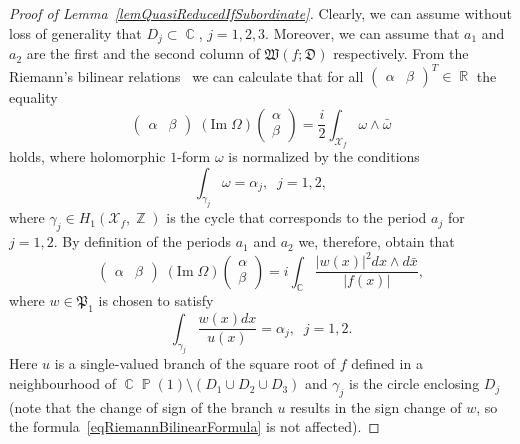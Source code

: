 \documentclass{amsart}
\numberwithin{equation}{section}
\theoremstyle{definition}
\theoremstyle{remark}
\DeclareMathOperator{\CC}{\mathbb C}
\DeclareMathOperator{\RR}{\mathbb R}
\DeclareMathOperator{\ZZ}{\mathbb Z}
\DeclareMathOperator{\PP}{\mathbb P}
\begin{document}
	\begin{proof}[Proof of Lemma~\ref{lemQuasiReducedIfSubordinate}]
		Clearly, we can assume without loss of generality that $D_j \subset \CC$, $j = 1,2,3$. Moreover, we can assume that $a_1$ and $a_2$ are the first and the second column of $\mathfrak W(f;\mathfrak D)$ respectively. From the Riemann's bilinear relations~\cite[Proposition~III.2.3]{FarkasKra1980} we can calculate that for all $\begin{pmatrix} \alpha & \beta \end{pmatrix}^T \in \RR$ the equality
		\[
		\begin{pmatrix}
			\alpha & \beta
		\end{pmatrix} \;(\mathrm{Im}\;\Omega) \begin{pmatrix}
			\alpha \\ \beta
		\end{pmatrix} = \frac{i}{2}\int_{\mathcal X_f}\omega \wedge \bar{\omega}
		\]
		holds, where holomorphic $1$-form $\omega$ is normalized by the conditions
		\[
		\int_{\gamma_j} \omega = \alpha_j,\;\; j = 1,2,
		\]
		where $\gamma_j \in H_1(\mathcal X_f, \ZZ)$ is the cycle that corresponds to the period $a_j$ for $j = 1,2$. By definition of the periods $a_1$ and $a_2$ we, therefore, obtain that
		\begin{equation}\label{eqRiemannBilinearFormula}
			\begin{pmatrix}
				\alpha & \beta
			\end{pmatrix} \;(\mathrm{Im}\;\Omega) \begin{pmatrix}
				\alpha \\ \beta
			\end{pmatrix} = i\int_{\CC}\frac{|w(x)|^2dx \wedge d\bar{x}}{|f(x)|},
		\end{equation}
		where $w \in \mathfrak P_1$ is chosen to satisfy
		\begin{equation}\label{eqNormalizationByVector}
			\int_{\gamma_j}\frac{w(x)dx}{u(x)} = \alpha_j,\;\;j =1,2.
		\end{equation}
		Here $u$ is a single-valued branch of the square root of $f$ defined in a neighbourhood of $\CC\PP(1)\setminus(D_1 \cup D_2 \cup D_3)$ and $\gamma_j$ is the circle enclosing $D_j$ (note that the change of sign of the branch $u$ results in the sign change of $w$, so the formula~\eqref{eqRiemannBilinearFormula} is not affected).
		

\end{proof}
\end{document}
